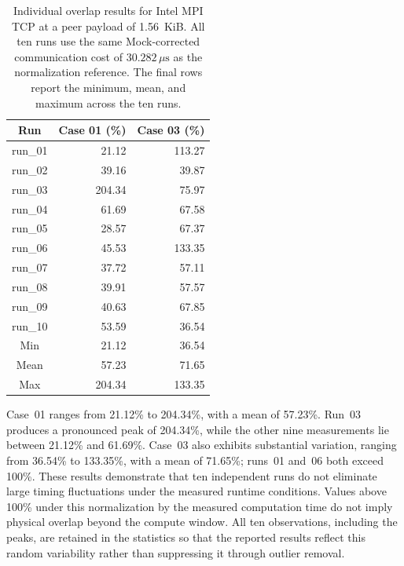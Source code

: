 \begin{table}[p]
    \centering
    \scriptsize
    \caption[Ten-run variability for Intel MPI TCP.]{Individual overlap
    results for Intel MPI TCP at a peer payload of 1.56~KiB.
    All ten runs use the same Mock-corrected communication cost of
    $30.282\,\mu\mathrm{s}$ as the normalization reference. The final rows
    report the minimum, mean, and maximum across the ten runs.}
    \label{tab:intelmpi-tcp-smallmsg-variability}
    \begin{tabular}{crr}
        \toprule
        Run & Case 01 (\%) & Case 03 (\%) \\
        \midrule
        run\_01 & 21.12  & 113.27 \\
        run\_02 & 39.16  & 39.87  \\
        run\_03 & 204.34 & 75.97  \\
        run\_04 & 61.69  & 67.58  \\
        run\_05 & 28.57  & 67.37  \\
        run\_06 & 45.53  & 133.35 \\
        run\_07 & 37.72  & 57.11  \\
        run\_08 & 39.91  & 57.57  \\
        run\_09 & 40.63  & 67.85  \\
        run\_10 & 53.59  & 36.54  \\
        \midrule
        Min  & 21.12  & 36.54  \\
        Mean & 57.23  & 71.65  \\
        Max  & 204.34 & 133.35 \\
        \bottomrule
    \end{tabular}
\end{table}

Case~01 ranges from 21.12\% to 204.34\%, with a mean of 57.23\%.
Run~03 produces a pronounced peak of 204.34\%, while the other nine
measurements lie between 21.12\% and 61.69\%. Case~03 also exhibits
substantial variation, ranging from 36.54\% to 133.35\%, with a mean
of 71.65\%; runs~01 and~06 both exceed 100\%. These results demonstrate
that ten independent runs do not eliminate large timing fluctuations
under the measured runtime conditions. Values above 100\% under this
normalization by the measured computation time do not imply physical overlap beyond the
compute window. All ten observations, including the peaks, are retained
in the statistics so that the reported results reflect this random
variability rather than suppressing it through outlier removal.

